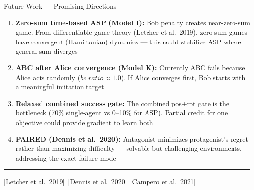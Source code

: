 \documentclass[aspectratio=169,xcolor=dvipsnames,t]{beamer}
\newcommand{\litfooter}[1]{%
  \vspace{2pt}%
  \hrule%
  \vspace{2pt}%
  {\tiny\color{LightDarkGrey} #1}%
}
\begin{document}
\begin{frame}[t]{Future Work — Promising Directions}
  \small
  \begin{enumerate}
    \item \textbf{Zero-sum time-based ASP (Model I):} Bob penalty creates near-zero-sum game. From differentiable game theory (Letcher et al.\ 2019), zero-sum games have convergent (Hamiltonian) dynamics — this could stabilize ASP where general-sum diverges
    \item \textbf{ABC after Alice convergence (Model K):} Currently ABC fails because Alice acts randomly ($bc\_ratio \approx 1.0$). If Alice converges first, Bob starts with a meaningful imitation target
    \item \textbf{Relaxed combined success gate:} The combined pos+rot gate is the bottleneck (70\% single-agent vs 0–10\% for ASP). Partial credit for one objective could provide gradient to learn both
    \item \textbf{PAIRED (Dennis et al.\ 2020):} Antagonist minimizes protagonist's regret rather than maximizing difficulty — solvable but challenging environments, addressing the exact failure mode
  \end{enumerate}

  \vfill\litfooter{[Letcher et al.\ 2019]~[Dennis et al.\ 2020]~[Campero et al.\ 2021]}
\end{frame}

\end{document}
